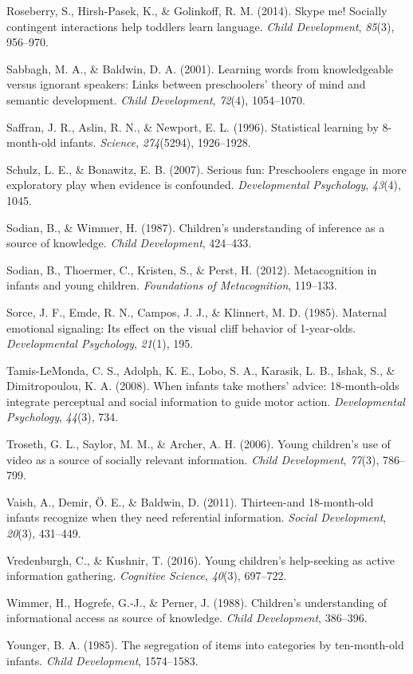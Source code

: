 \documentclass[floatsintext,man]{apa6}
\theoremstyle{definition}
\theoremstyle{definition}
\theoremstyle{definition}
\theoremstyle{remark}
\begin{document}
\hypertarget{ref-roseberry2014skype}{}
Roseberry, S., Hirsh-Pasek, K., \& Golinkoff, R. M. (2014). Skype me!
Socially contingent interactions help toddlers learn language.
\emph{Child Development}, \emph{85}(3), 956--970.

\hypertarget{ref-sabbagh2001learning}{}
Sabbagh, M. A., \& Baldwin, D. A. (2001). Learning words from
knowledgeable versus ignorant speakers: Links between preschoolers'
theory of mind and semantic development. \emph{Child Development},
\emph{72}(4), 1054--1070.

\hypertarget{ref-saffran1996statistical}{}
Saffran, J. R., Aslin, R. N., \& Newport, E. L. (1996). Statistical
learning by 8-month-old infants. \emph{Science}, \emph{274}(5294),
1926--1928.

\hypertarget{ref-schulz2007serious}{}
Schulz, L. E., \& Bonawitz, E. B. (2007). Serious fun: Preschoolers
engage in more exploratory play when evidence is confounded.
\emph{Developmental Psychology}, \emph{43}(4), 1045.

\hypertarget{ref-sodian1987children}{}
Sodian, B., \& Wimmer, H. (1987). Children's understanding of inference
as a source of knowledge. \emph{Child Development}, 424--433.

\hypertarget{ref-sodian2012metacognition}{}
Sodian, B., Thoermer, C., Kristen, S., \& Perst, H. (2012).
Metacognition in infants and young children. \emph{Foundations of
Metacognition}, 119--133.

\hypertarget{ref-sorce1985maternal}{}
Sorce, J. F., Emde, R. N., Campos, J. J., \& Klinnert, M. D. (1985).
Maternal emotional signaling: Its effect on the visual cliff behavior of
1-year-olds. \emph{Developmental Psychology}, \emph{21}(1), 195.

\hypertarget{ref-tamis2008infants}{}
Tamis-LeMonda, C. S., Adolph, K. E., Lobo, S. A., Karasik, L. B., Ishak,
S., \& Dimitropoulou, K. A. (2008). When infants take mothers' advice:
18-month-olds integrate perceptual and social information to guide motor
action. \emph{Developmental Psychology}, \emph{44}(3), 734.

\hypertarget{ref-troseth2006young}{}
Troseth, G. L., Saylor, M. M., \& Archer, A. H. (2006). Young children's
use of video as a source of socially relevant information. \emph{Child
Development}, \emph{77}(3), 786--799.

\hypertarget{ref-vaish2011thirteen}{}
Vaish, A., Demir, Ö. E., \& Baldwin, D. (2011). Thirteen-and
18-month-old infants recognize when they need referential information.
\emph{Social Development}, \emph{20}(3), 431--449.

\hypertarget{ref-vredenburgh2016young}{}
Vredenburgh, C., \& Kushnir, T. (2016). Young children's help-seeking as
active information gathering. \emph{Cognitive Science}, \emph{40}(3),
697--722.

\hypertarget{ref-wimmer1988children}{}
Wimmer, H., Hogrefe, G.-J., \& Perner, J. (1988). Children's
understanding of informational access as source of knowledge.
\emph{Child Development}, 386--396.

\hypertarget{ref-younger1985segregation}{}
Younger, B. A. (1985). The segregation of items into categories by
ten-month-old infants. \emph{Child Development}, 1574--1583.
\end{document}
